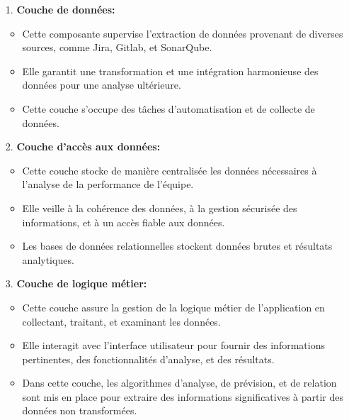     \begin{enumerate}

        \item[1.] \textbf{Couche de données: } 
                \begin{itemize}
                \item Cette composante supervise l'extraction de données provenant de diverses sources, comme Jira, Gitlab, et SonarQube.
                \item Elle garantit une transformation et une intégration harmonieuse des données pour une analyse ultérieure.
                \item Cette couche s'occupe des tâches d'automatisation et de collecte de données.
            \end{itemize}
            
         \item[2.] \textbf{Couche d'accès aux données: }
                \begin{itemize}
                \item Cette couche stocke de manière centralisée les données nécessaires à l'analyse de la performance de l'équipe.
                \item Elle veille à la cohérence des données, à la gestion sécurisée des informations, et à un accès fiable aux données.
                \item Les bases de données relationnelles stockent données brutes et résultats analytiques.
            \end{itemize}
            
        \item[3.] \textbf{Couche de logique métier: }
                \begin{itemize}
                \item Cette couche assure la gestion de la logique métier de l'application en collectant, traitant, et examinant les données.
                \item Elle interagit avec l'interface utilisateur pour fournir des informations pertinentes, des fonctionnalités d'analyse, et des résultats.
                \item Dans cette couche, les algorithmes d'analyse, de prévision, et de relation sont mis en place pour extraire des informations significatives à partir des données non transformées.
            \end{itemize}
            

\end{enumerate}
